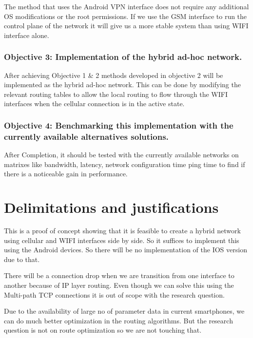 The method that uses the Android  VPN interface does not require any additional OS modifications or the root permissions. If we use the GSM interface to run the control plane of the network it will give us a more stable system than using  WIFI  interface alone.

\vspace{12pt}
\subsubsection{Objective 3: Implementation of the hybrid ad-hoc network.}
 After achieving Objective 1 \& 2 methods developed in objective 2 will be implemented as the hybrid ad-hoc network. This can be done by modifying the relevant routing tables to allow the local routing to flow through the  WIFI  interfaces when the cellular connection is in the active state.

\vspace{12pt}
\subsubsection{Objective 4: Benchmarking this implementation with the currently available alternatives solutions.}

After Completion, it should be tested with the currently available networks on matrixes like bandwidth, latency, network configuration time ping time to find if there is a noticeable gain in performance.

\vspace{12pt}



\section{Delimitations and justifications}
\vspace{12pt}
This is a proof of concept showing that it is feasible to create a hybrid network using cellular and  WIFI  interfaces side by side. So it suffices to implement this using the Android devices. So there will be no implementation of the IOS version due to that.

\vspace{12pt}
There will be a connection drop when we are transition from one interface to another because of IP layer routing. Even though we can solve this using the Multi-path TCP connections it is out of scope with the research question. 

\vspace{12pt}
Due to the availability of large no of parameter data in current smartphones, we can do much better optimization in the routing algorithms. But the research question is not on route optimization so we are not touching that.

